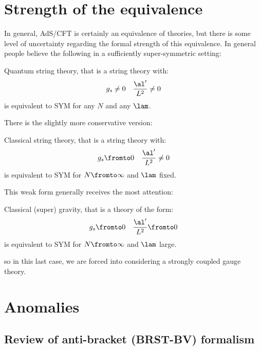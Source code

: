 \documentclass{booc}
\begin{document}
\section{Strength of the equivalence}

In general, AdS/CFT is certainly an equivalence of theories, but there is some level of
uncertainty regarding the formal strength of this equivalence.
In general people believe the following in a sufficiently super-symmetric setting:
\begin{con}[Strongest]
Quantum string theory, that is a string theory with:
\begin{align}
g_s \neq 0
&&
\frac{\al'}{L^2} \neq 0
\end{align}
is equivalent to SYM for any $N$ and any $\lam$.
\end{con}
There is the slightly more conservative version:
\begin{con}[Strong]
Classical string theory, that is a string theory with:
\begin{align}
g_s\fromto 0
&&
\frac{\al'}{L^2}\neq 0
\end{align}
is equivalent to SYM for $N\fromto \infty$ and $\lam$ fixed.
\end{con}
This weak form generally receives the most attention:
\begin{con}[Weak]
Classical (super) gravity, that is a theory of the form:
\begin{align}
g_s\fromto 0
&&
\frac{\al'}{L^2} \fromto 0
\end{align}
is equivalent to SYM for $N\fromto \infty$ and $\lam$ large.
\end{con}
so in this last case, we are forced into considering a strongly coupled gauge theory.

\section{Anomalies}

\subsection{Review of anti-bracket (BRST-BV) formalism}
\end{document}

